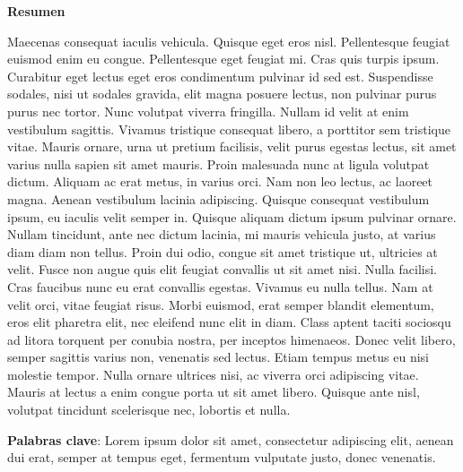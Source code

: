 
\begin{center}

\textbf{}

\vspace{2cm}

\Large{\textbf{Resumen}}

\end{center}

\vspace{1cm}

Maecenas consequat iaculis vehicula. Quisque eget eros nisl. Pellentesque feugiat euismod enim eu congue. Pellentesque eget feugiat mi. Cras quis turpis ipsum. Curabitur eget lectus eget eros condimentum pulvinar id sed est. Suspendisse sodales, nisi ut sodales gravida, elit magna posuere lectus, non pulvinar purus purus nec tortor. Nunc volutpat viverra fringilla. Nullam id velit at enim vestibulum sagittis. Vivamus tristique consequat libero, a porttitor sem tristique vitae. Mauris ornare, urna ut pretium facilisis, velit purus egestas lectus, sit amet varius nulla sapien sit amet mauris. Proin malesuada nunc at ligula volutpat dictum. Aliquam ac erat metus, in varius orci. Nam non leo lectus, ac laoreet magna. Aenean vestibulum lacinia adipiscing. Quisque consequat vestibulum ipsum, eu iaculis velit semper in. Quisque aliquam dictum ipsum pulvinar ornare.\\

Nullam tincidunt, ante nec dictum lacinia, mi mauris vehicula justo, at varius diam diam non tellus. Proin dui odio, congue sit amet tristique ut, ultricies at velit. Fusce non augue quis elit feugiat convallis ut sit amet nisi. Nulla facilisi. Cras faucibus nunc eu erat convallis egestas. Vivamus eu nulla tellus. Nam at velit orci, vitae feugiat risus. Morbi euismod, erat semper blandit elementum, eros elit pharetra elit, nec eleifend nunc elit in diam. Class aptent taciti sociosqu ad litora torquent per conubia nostra, per inceptos himenaeos. Donec velit libero, semper sagittis varius non, venenatis sed lectus. Etiam tempus metus eu nisi molestie tempor. Nulla ornare ultrices nisi, ac viverra orci adipiscing vitae. Mauris at lectus a enim congue porta ut sit amet libero. Quisque ante nisl, volutpat tincidunt scelerisque nec, lobortis et nulla.

\vspace{1cm}

\textbf{Palabras clave}: Lorem ipsum dolor sit amet, consectetur adipiscing elit, aenean dui erat, semper at tempus eget, fermentum vulputate justo, donec venenatis.

\vspace{3cm}


